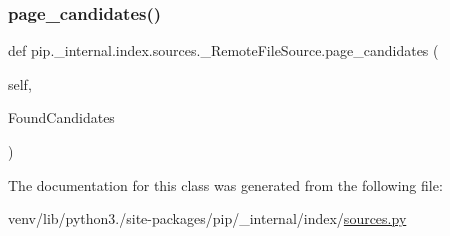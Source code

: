 \mbox{\label{classpip_1_1__internal_1_1index_1_1sources_1_1__RemoteFileSource_a52ace3b277ca74b3141195c230a73339}} 
\subsubsection{\texorpdfstring{page\+\_\+candidates()}{page\_candidates()}}
{\footnotesize\ttfamily def pip.\+\_\+internal.\+index.\+sources.\+\_\+\+Remote\+File\+Source.\+page\+\_\+candidates (\begin{DoxyParamCaption}\item[{}]{self,  }\item[{}]{Found\+Candidates }\end{DoxyParamCaption})}



The documentation for this class was generated from the following file\+:\begin{DoxyCompactItemize}
\item 
venv/lib/python3./site-\/packages/pip/\+\_\+internal/index/\hyperlink{sources_8py}{sources.\+py}\end{DoxyCompactItemize}
